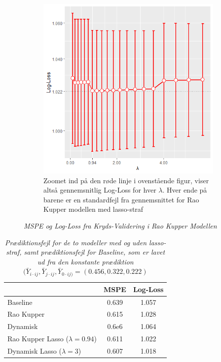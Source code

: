 \documentclass[11pt,a4paper]{article}
\begin{document}
\begin{figure}[htb!]
\begin{subfigure}[b]{0.4\textwidth}
    \includegraphics[width=\textwidth]{STATLOGLOSSBARNY1.png}
    \caption{Zoomet ind på den røde linje i ovenstående figur, viser altså gennemsnitlig Log-Loss for hver $\lambda$. Hver ende på barene er en standardfejl fra gennemsnittet for Rao Kupper modellen med lasso-straf}
    \label{fig:LogLossBarStat}  
    \end{subfigure}
\caption{\textit{MSPE og Log-Loss fra Kryds-Validering i Rao Kupper Modellen}}
\label{fig:MSPELOGLOSSStatisk}
\end{figure}
\begin{table}[ht]
\centering
\begin{adjustbox}{max width=\textwidth}
\begin{tabular}{|l|cc|}
\hline 
 & MSPE & Log-Loss  \\
 \hline
Baseline & 0.639 & 1.057 \\
Rao Kupper & 0.615 & 1.028 \\
Dynamisk & 0.6e6 & 1.064 \\
Rao Kupper Lasso ($\lambda=0.94$)& 0.611 & 1.022 \\
Dynamisk Lasso ($\lambda=3$) & 0.607 & 1.018 \\
   \hline   
\end{tabular} 
\end{adjustbox}
\caption{\label{tab:KVMSPELOGLOSS}\textit{Prædiktionsfejl for de to modeller med og uden lasso-straf, samt prædiktionsfejl for Baseline, som er lavet ud fra den konstante prædiktion $(\bar{Y}_{i \cdot ij},\bar{Y}_{j \cdot ij}, \bar{Y}_{0 \cdot ij)} = (0.456,0.322,0.222)$}}
\end{table}
\end{document}
